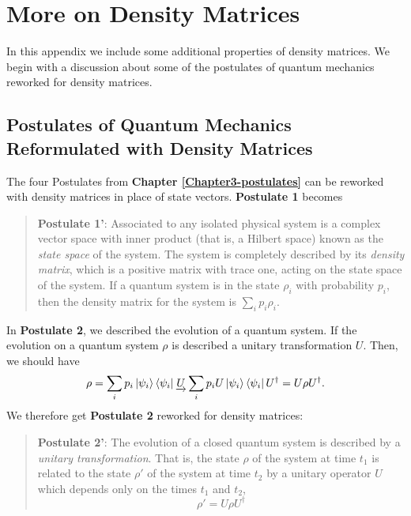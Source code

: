 
\chapter{More on Density Matrices} %

\label{AppendixB} %

In this appendix we include some additional properties of density matrices.  We begin with a discussion about some of the postulates of quantum mechanics reworked for density matrices.

\section{Postulates of Quantum Mechanics Reformulated with Density Matrices}



The four Postulates from \textbf{Chapter \ref{Chapter3-postulates}} can be reworked with density matrices in place of state vectors. \textbf{Postulate 1} becomes
\begin{quote}
\textbf{Postulate 1'}: Associated to any isolated physical system is a complex vector space with inner product (that is, a Hilbert space) known as the \textit{state space} of the system. The system is completely described by its \textit{density matrix}, which is a positive matrix with trace one, acting on the state space of the system. If a quantum system is in the state $\rho_i$ with probability $p_i$, then the density matrix for the system is $\sum_i p_i \rho_i$.    
\end{quote}

In \textbf{Postulate 2}, we described the evolution of a quantum system.  If the evolution on a quantum system $\rho$ is described a unitary transformation $U$. Then, we should have
    \begin{equation}
        \rho=\sum_i p_i \ket{\psi_i}\bra{\psi_i}	\underrightarrow{U}\sum_i p_i U \ket{\psi_i}\bra{\psi_i}U^\dagger=U \rho U^\dagger.
    \end{equation}
We therefore get \textbf{Postulate 2} reworked for density matrices:  
\begin{quote}
    {\bf{Postulate 2'}}: The evolution of a closed quantum system is described by a \textit{unitary transformation}. That is, the state $\rho$ of the system at time $t_1$ is related to the state $\rho'$ of the system at time $t_2$ by a unitary operator $U$ which depends only on the times $t_1$ and $t_2$,
    \begin{equation} \label{eqn: density matrix postulate 2}
    \rho'=U\rho U^\dagger        
    \end{equation}
\end{quote}

